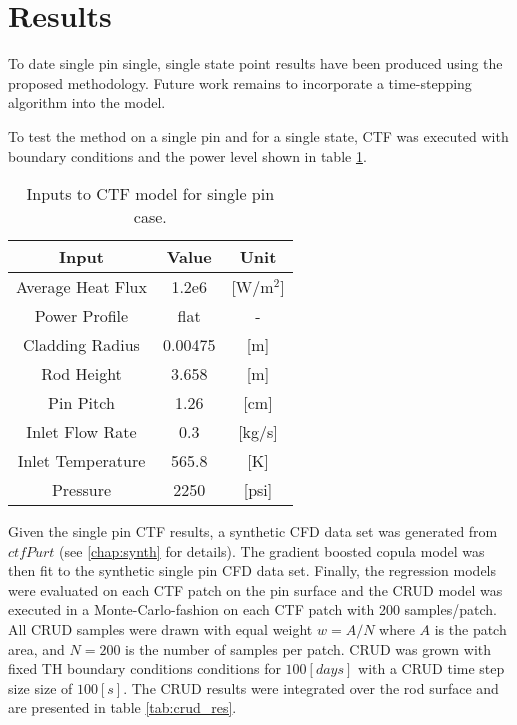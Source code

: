 \section{Results}

To date single pin single, single state point results have been produced using the proposed methodology.  Future work remains to incorporate a time-stepping algorithm into the model. 

To test the method on a single pin and for a single state, CTF was executed with boundary conditions and the power level shown in table \ref{tab:ctf_inputs}.  

\begin{table}[h!]
\begin{center}
\begin{tabular}{|c|c|c|}
\hline 
Input	& Value	& Unit	\\ \hline
Average Heat Flux	& 1.2e6	& [W/$\mathrm m^2$]	\\
Power Profile	& flat	& -	\\
Cladding Radius	& 0.00475	&[m]	\\
Rod Height	&3.658	&[m]	\\
Pin Pitch  & 1.26   & [cm]  \\
Inlet Flow Rate	& 0.3	&[kg/s]	\\
Inlet Temperature	&565.8	&[K]	\\
Pressure	&2250	&[psi]	\\
\hline
\end{tabular}
\caption{Inputs to CTF model for single pin case.}
\label{tab:ctf_inputs}
\end{center}
\end{table}

Given the single pin CTF results, a synthetic CFD data set was generated  from $ctfPurt$ (see \autoref{chap:synth} for details).
The gradient boosted copula model was then fit to the synthetic single pin CFD data set.  Finally, the regression models were evaluated on each CTF patch on the pin surface and the CRUD model was executed in a Monte-Carlo-fashion on each CTF patch with 200 samples/patch. All CRUD samples were drawn with equal weight $w =A/N$ where $A$ is the patch area, and $N=200$ is the number of samples per patch.  CRUD was grown with fixed TH boundary conditions conditions for $100[days]$ with a CRUD time step size size of $100[s]$. The CRUD results were integrated over the rod surface and are presented in table \ref{tab:crud_res}.

